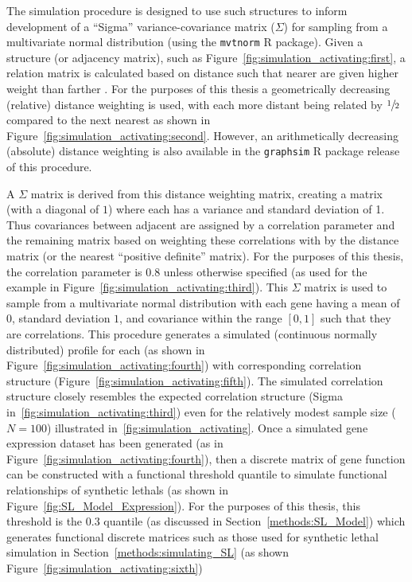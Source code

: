 The simulation procedure is designed to use such  structures to inform development of a ``Sigma'' variance-covariance matrix ($\Sigma$) for sampling from a multivariate normal distribution (using the \texttt{mvtnorm} R package). Given a  structure (or adjacency matrix), such as Figure~\ref{fig:simulation_activating:first}, a relation matrix is calculated based on distance such that nearer  are given higher weight than farther . For the purposes of this thesis a geometrically decreasing (relative) distance weighting is used, with each more distant  being related by $\sfrac{1}{2}$ compared to the next nearest as shown in Figure~\ref{fig:simulation_activating:second}. However, an arithmetically decreasing (absolute) distance weighting is also available in the \texttt{graphsim} R package release of this procedure.

A $\Sigma$ matrix is derived from this distance weighting matrix, creating a matrix (with a diagonal of $1$) where each  has a variance and standard deviation of 1. Thus covariances between adjacent  are assigned by a correlation parameter and the remaining matrix based on weighting these correlations with by the distance matrix (or the nearest ``positive definite'' matrix). For the purposes of this thesis, the correlation parameter is $0.8$ unless otherwise specified (as used for the example in Figure~\ref{fig:simulation_activating:third}). This $\Sigma$ matrix is used to sample from a multivariate normal distribution with each gene having a mean of $0$, standard deviation $1$, and covariance within the range $[0,1]$ such that they are correlations. This procedure generates a simulated (continuous normally distributed)  profile for each  (as shown in Figure~\ref{fig:simulation_activating:fourth}) with corresponding correlation structure (Figure~\ref{fig:simulation_activating:fifth}). The simulated correlation structure closely resembles the expected correlation structure (Sigma in~\ref{fig:simulation_activating:third}) even for the relatively modest sample size ($N=100$) illustrated in~\ref{fig:simulation_activating}. Once a simulated \gls{gene expression} dataset has been generated (as in Figure~\ref{fig:simulation_activating:fourth}), then a discrete matrix of gene function can be constructed with a functional threshold quantile to simulate functional relationships of \glspl{synthetic lethal} (as shown in Figure~\ref{fig:SL_Model_Expression}). For the purposes of this thesis, this threshold is the 0.3 quantile (as discussed in Section~\ref{methods:SL_Model}) which generates functional discrete matrices such as those used for \gls{synthetic lethal} simulation in Section~\ref{methods:simulating_SL} (as shown Figure~\ref{fig:simulation_activating:sixth})

